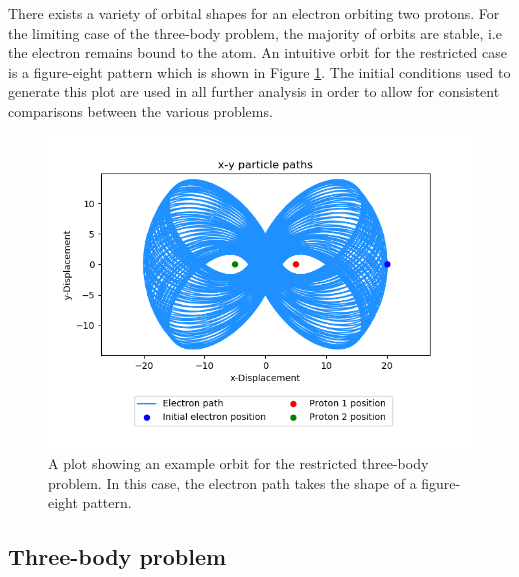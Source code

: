 \documentclass[12pt]{article} %
\numberwithin{equation}{subsection} %
\begin{document}
There exists a variety of orbital shapes for an electron orbiting two protons. For the limiting case of the three-body problem, the majority of orbits are stable, i.e the electron remains bound to the atom. An intuitive orbit for the restricted case is a figure-eight pattern which is shown in Figure \ref{fig: stat protons}. The initial conditions used to generate this plot are used in all further analysis in order to allow for consistent comparisons between the various problems.
\begin{figure}[h]
    \centering
    \captionsetup{justification=centering}
	\includegraphics[scale=0.45]{images/statPath2.png}
	\caption{A plot showing an example orbit for the restricted three-body problem. In this case, the electron path takes the shape of a figure-eight pattern.}
	\label{fig: stat protons}
	\end{figure}


\subsection{Three-body problem} \label{subsec: three-body problem}
\end{document}
